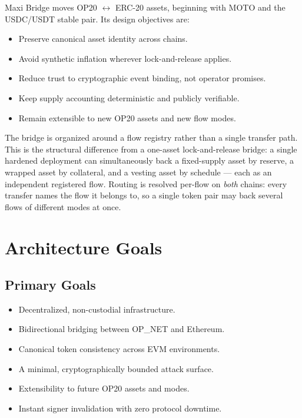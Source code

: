 \documentclass[11pt,a4paper]{article}
\begin{document}
Maxi Bridge moves OP20 $\leftrightarrow$ ERC-20 assets, beginning with MOTO and the USDC/USDT stable pair. Its design objectives are:

\begin{itemize}
  \item Preserve canonical asset identity across chains.
  \item Avoid synthetic inflation wherever lock-and-release applies.
  \item Reduce trust to cryptographic event binding, not operator promises.
  \item Keep supply accounting deterministic and publicly verifiable.
  \item Remain extensible to new OP20 assets and new flow modes.
\end{itemize}

The bridge is organized around a flow registry rather than a single transfer path. This is the structural difference from a one-asset lock-and-release bridge: a single hardened deployment can simultaneously back a fixed-supply asset by reserve, a wrapped asset by collateral, and a vesting asset by schedule --- each as an independent registered flow. Routing is resolved per-flow on \emph{both} chains: every transfer names the flow it belongs to, so a single token pair may back several flows of different modes at once.

\section{Architecture Goals}

\subsection{Primary Goals}

\begin{itemize}
  \item Decentralized, non-custodial infrastructure.
  \item Bidirectional bridging between OP\_NET and Ethereum.
  \item Canonical token consistency across EVM environments.
  \item A minimal, cryptographically bounded attack surface.
  \item Extensibility to future OP20 assets and modes.
  \item Instant signer invalidation with zero protocol downtime.
\end{itemize}
\end{document}

